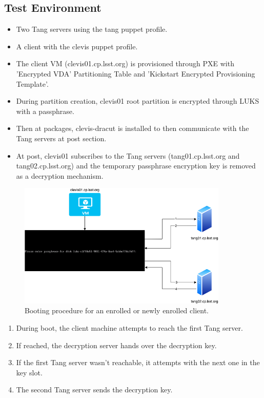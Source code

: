 \newpage
\subsection{Test Environment}
\begin{itemize}
  \item Two Tang servers using the tang puppet profile.
  \item A client with the clevis puppet profile.
  \item The client VM (clevis01.cp.lsst.org) is provisioned through PXE with 'Encrypted VDA' Partitioning Table and 'Kickstart Encrypted Provisioning Template'.
  \item During partition creation, clevis01 root partition is encrypted through LUKS with a passphrase.
  \item Then at packages, clevis-dracut is installed to then communicate with the Tang servers at post section.
  \item At post, clevis01 subscribes to the Tang servers (tang01.cp.lsst.org and tang02.cp.lsst.org) and the temporary passphrase encryption key is removed as a decryption mechanism.
\end{itemize}

\begin{figure}
  \includegraphics[width=10cm]{images/image4.png}
  \centering
  \caption{Booting procedure for an enrolled or newly enrolled client.}
\end{figure}

\begin{enumerate}
  \item During boot, the client machine attempts to reach the first Tang server.
  \item If reached, the decryption server hands over the decryption key.
  \item If the first Tang server wasn't reachable, it attempts with the next one in the key slot.
  \item The second Tang server sends the decryption key.
\end{enumerate}

